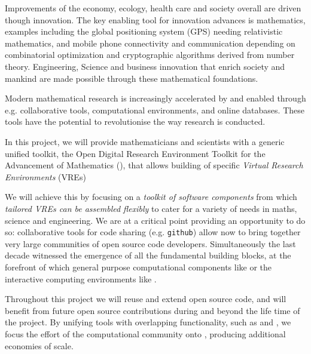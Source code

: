 Improvements of the economy, ecology, health care and society overall
are driven though innovation. The key enabling tool for innovation
advances is mathematics, examples including the global positioning
system (GPS) needing relativistic mathematics, and mobile phone
connectivity and communication depending on combinatorial optimization
and cryptographic algorithms derived from number theory. Engineering,
Science and business innovation that enrich society and mankind are
made possible through these mathematical foundations.

Modern mathematical research is increasingly accelerated by and
enabled through e.g. collaborative tools, computational environments,
and online databases.
These tools have the potential to
revolutionise the way research is conducted. 

In this project, we will provide mathematicians and scientists with a
generic unified toolkit, the Open Digital Research Environment Toolkit
for the Advancement of Mathematics (\TheProject), that allows
building of specific \emph{Virtual Research Environments} (VREs)


We will achieve this by focusing on a \emph{toolkit of software
  components} from which \emph{tailored VREs can be assembled
  flexibly} to cater for a variety of needs in maths, science and
engineering.  We are at a critical point providing an opportunity to
do so: collaborative tools for code sharing (e.g.
\texttt{github}) allow now to bring together very large communities of
open source code developers.%
Simultaneously the last decade witnessed the emergence of all the
fundamental building blocks, at the forefront of which general purpose
computational components like \Sage or the interactive computing
environments like \Jupyter.

Throughout this project we will reuse and extend open source code, and
\TheProject will benefit from future open source contributions during
and beyond the life time of the project. By unifying tools with
overlapping functionality, such as \Jupyter and \Sage, we focus the
effort of the computational community onto \TheProject, producing
additional economies of scale.

